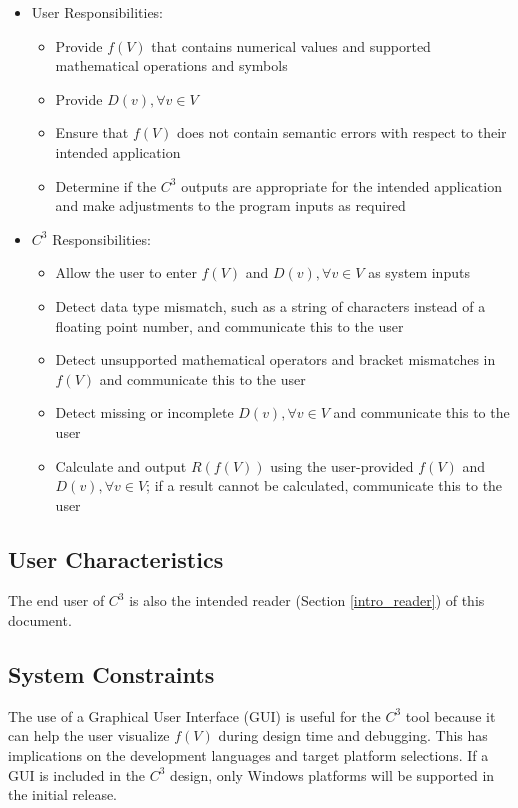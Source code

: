 \documentclass[12pt]{article}
\newcommand{\prognameAbbrv}{$C^{3}$}
\begin{document}
\begin{itemize}
	\item User Responsibilities:
	\begin{itemize}
		\item Provide $f(V)$ that contains numerical values and supported 
		mathematical operations and symbols
		\item Provide $D(v), \forall v\in V$
		\item Ensure that $f(V)$ does not contain semantic errors with respect 
		to their intended application
		\item Determine if the \prognameAbbrv{} outputs are appropriate for 
		the intended application and make adjustments to the program inputs as 
		required
	\end{itemize}

	\item \prognameAbbrv{} Responsibilities:
	\begin{itemize}
		\item Allow the user to enter $f(V)$ and $D(v), \forall v\in V$	as 
		system inputs
		\item Detect data type mismatch, such as a string of characters instead 
		of a floating point number, and communicate this to the user
		\item Detect unsupported mathematical operators and bracket mismatches 
		in $f(V)$ and communicate this to the user
		\item Detect missing or incomplete $D(v), \forall v\in V$ and 
		communicate this to the user
		\item Calculate and output $R(f(V))$ using the user-provided $f(V)$ and 
		$D(v), \forall v\in V$; if a result cannot be calculated, communicate 
		this to the user
	\end{itemize}
\end{itemize}

\subsection{User Characteristics} \label{SecUserCharacteristics}
The end user of \prognameAbbrv{} is also the intended reader (Section 
\ref{intro_reader}) of this document.

\subsection{System Constraints}
\label{sec_sysconstraints}
The use of a Graphical User Interface (GUI) is useful for the \prognameAbbrv{} 
tool because it can help the user visualize $f(V)$ during design time and 
debugging. This has implications on the development languages and target 
platform selections. If a GUI is included in the \prognameAbbrv{} design, only 
Windows platforms will be supported in the initial release.
\end{document}
